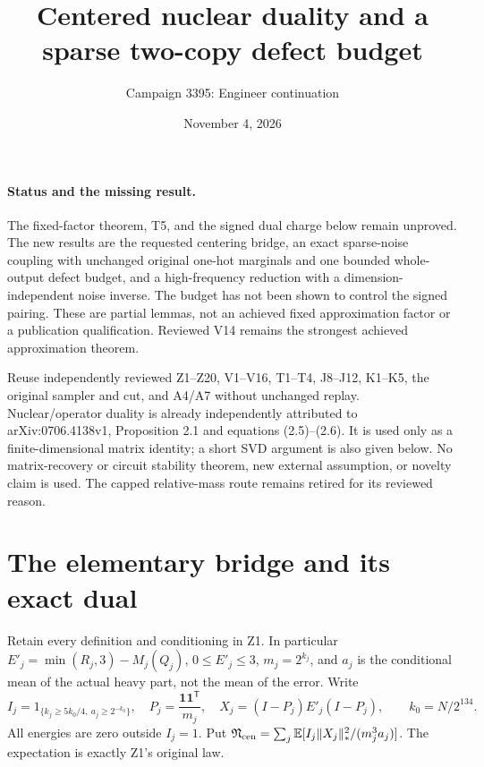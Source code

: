 \documentclass[11pt]{article}
\title{Centered nuclear duality and a sparse two-copy defect budget}
\author{Campaign 3395: Engineer continuation}
\date{November 4, 2026}
\newcommand{\E}{\mathbb E}
\begin{document}
\maketitle

\paragraph{Status and the missing result.}
The fixed-factor theorem, T5, and the signed dual charge below remain
unproved. The new results are the requested centering bridge, an exact
sparse-noise coupling with unchanged original one-hot marginals and one
bounded whole-output defect budget, and a high-frequency reduction with
a dimension-independent noise inverse. The budget has not been shown
to control the signed pairing. These are partial lemmas, not an
achieved fixed approximation factor or a publication qualification.
Reviewed V14 remains the strongest achieved approximation theorem.

Reuse independently reviewed Z1--Z20, V1--V16, T1--T4, J8--J12,
K1--K5, the original sampler and cut, and A4/A7 without unchanged
replay. Nuclear/operator duality is already independently attributed
to arXiv:0706.4138v1, Proposition 2.1 and equations (2.5)--(2.6).
It is used only as a finite-dimensional matrix identity; a short
SVD argument is also given below. No matrix-recovery or circuit
stability theorem, new external assumption, or novelty claim is used.
The capped relative-mass route remains retired for its reviewed reason.

\section{The elementary bridge and its exact dual}
Retain every definition and conditioning in Z1. In particular
$E'_j=\min(R_j,3)-M_j(Q_j)$, $0\le E'_j\le3$,
$m_j=2^{k_j}$, and $a_j$ is the conditional mean of the actual
heavy part, not the mean of the error. Write
\[
 I_j=1_{\{k_j\ge5k_0/4,\ a_j\ge2^{-k_0}\}},\quad
 P_j=\frac{\boldsymbol1\boldsymbol1^{\mathsf T}}{m_j},\quad
 X_j=(I-P_j)E'_j(I-P_j),\qquad k_0=N/2^{134}.
\]
All energies are zero outside $I_j=1$. Put
$\mathfrak N_{\rm cen}=\sum_j\E[I_j\|X_j\|_*^2/(m_j^3a_j)]$.
The expectation is exactly Z1's original law.
\end{document}
